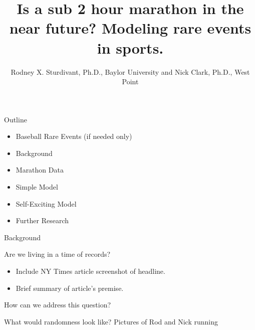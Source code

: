 \documentclass[
  ignorenonframetext,
]{beamer}
\title{Is a sub 2 hour marathon in the near future? Modeling rare events
in sports.}
\author{Rodney X. Sturdivant, Ph.D., Baylor University and Nick Clark,
Ph.D., West Point}
\date{}
\providecommand{\tightlist}{%
  \setlength{\itemsep}{0pt}\setlength{\parskip}{0pt}}
\begin{document}
\frame{\titlepage}

\begin{frame}{Outline}
\protect\hypertarget{outline}{}
\begin{itemize}
\item
  Baseball Rare Events (if needed only)
\item
  Background
\item
  Marathon Data
\item
  Simple Model
\item
  Self-Exciting Model
\item
  Further Research
\end{itemize}
\end{frame}

\begin{frame}{Background}
\protect\hypertarget{background}{}
\begin{block}{Are we living in a time of records?}
\protect\hypertarget{are-we-living-in-a-time-of-records}{}
\begin{itemize}
\tightlist
\item
  Include NY Times article screenshot of headline.
\item
  Brief summary of article's premise.
\end{itemize}
\end{block}

\begin{block}{How can we address this question?}
\protect\hypertarget{how-can-we-address-this-question}{}
\end{block}

\begin{block}{What would randomness look like?}
\protect\hypertarget{what-would-randomness-look-like}{}
Pictures of Rod and Nick running
\end{block}
\end{frame}
\end{document}
